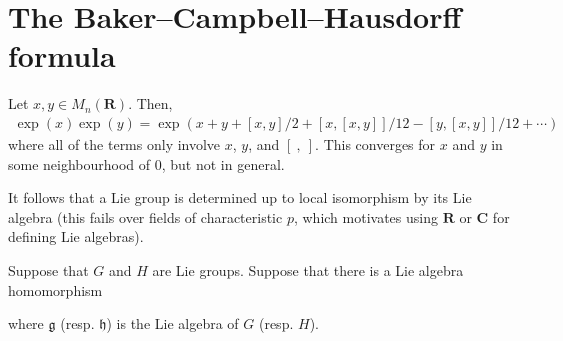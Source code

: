 \documentclass [11 pt, twoside] {article}
\begin{document}

\section{The Baker--Campbell--Hausdorff formula}
Let $x,y\in M_{n}(\mathbf{R})$. Then,
\begin{align*}
	\exp(x)\exp (y) = \exp (x+y+ [x,y]/2 + [x,[x,y]]/12 - [y,[x,y]]/12 + \cdots)
\end{align*}
where all of the terms only involve $x$, $y$, and $[\ ,\ ]$.
This converges for $x$ and $y$ in some neighbourhood of $0$, but not in general.

It follows that a Lie group is determined up to local isomorphism by its Lie algebra (this fails over fields of characteristic $p$, which motivates using $\mathbf{R}$ or $\mathbf{C}$ for defining Lie algebras).

Suppose that $G$ and $H$ are Lie groups.
Suppose that there is a Lie algebra homomorphism  
where $\mathfrak{g}$ (resp. $\mathfrak{h}$) is the Lie algebra of $G$ (resp. $H$).
\end{document}

